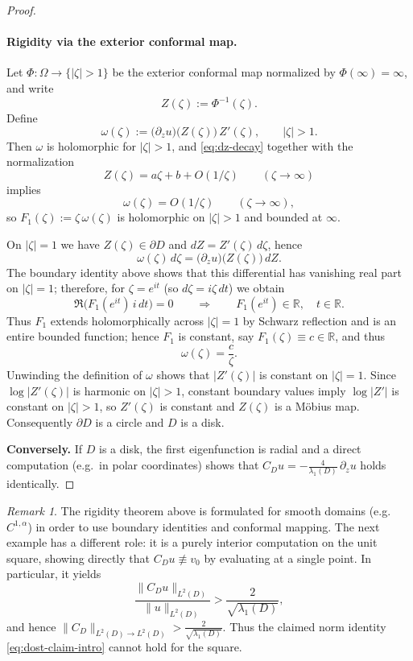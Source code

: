 \documentclass{amsart}
\newcommand{\R}{\mathbb{R}}
\theoremstyle{plain}
\theoremstyle{remark}
\newtheorem{remark}[theorem]{Remark}
\begin{document}
\begin{proof}
\paragraph{Rigidity via the exterior conformal map.}
Let $\Phi:\Omega\to\{|\zeta|>1\}$ be the exterior conformal map normalized by $\Phi(\infty)=\infty$,
and write
\[
Z(\zeta):=\Phi^{-1}(\zeta).
\]
Define
\[
\omega(\zeta):=\bigl(\partial_z u\bigr)\bigl(Z(\zeta)\bigr)\,Z'(\zeta),
\qquad |\zeta|>1.
\]
Then $\omega$ is holomorphic for $|\zeta|>1$, and \eqref{eq:dz-decay} together with the normalization
\[
Z(\zeta)=a\zeta+b+O(1/\zeta)\qquad (\zeta\to\infty)
\]
implies
\[
\omega(\zeta)=O(1/\zeta)\qquad (\zeta\to\infty),
\]
so $F_1(\zeta):=\zeta\,\omega(\zeta)$ is holomorphic on $|\zeta|>1$ and bounded at $\infty$.

On $|\zeta|=1$ we have $Z(\zeta)\in\partial D$ and $dZ=Z'(\zeta)\,d\zeta$, hence
\[
\omega(\zeta)\,d\zeta
=\bigl(\partial_z u\bigr)\bigl(Z(\zeta)\bigr)\,dZ.
\]
The boundary identity above shows that this differential has vanishing real part on $|\zeta|=1$; therefore,
for $\zeta=e^{it}$ (so $d\zeta=i\zeta\,dt$) we obtain
\[
\Re\!\bigl(F_1(e^{it})\,i\,dt\bigr)=0
\qquad\Longrightarrow\qquad
F_1(e^{it})\in\R,\quad t\in\R.
\]
Thus $F_1$ extends holomorphically across $|\zeta|=1$ by Schwarz reflection and is an entire bounded
function; hence $F_1$ is constant, say $F_1(\zeta)\equiv c\in\R$, and thus
\[
\omega(\zeta)=\frac{c}{\zeta}.
\]
Unwinding the definition of $\omega$ shows that $|Z'(\zeta)|$ is constant on $|\zeta|=1$.
Since $\log|Z'(\zeta)|$ is harmonic on $|\zeta|>1$, constant boundary values imply $\log|Z'|$ is constant
on $|\zeta|>1$, so $Z'(\zeta)$ is constant and $Z(\zeta)$ is a M\"obius map. Consequently $\partial D$ is a circle
and $D$ is a disk.


\noindent\textbf{Conversely.}
If $D$ is a disk, the first eigenfunction is radial and a direct computation (e.g.\ in polar coordinates)
shows that $C_D u = -\frac{4}{\lambda_1(D)}\,\partial_z u$ holds identically.
\end{proof}
\begin{remark}
The rigidity theorem above  is formulated for smooth domains (e.g.\ $C^{1,\alpha}$) in order to use
boundary identities and conformal mapping. The next example has a different role: it is a purely
interior computation on the unit square, showing directly that $C_Du\not\equiv v_0$ by evaluating at
a single point. In particular, it yields
\[
\frac{\|C_Du\|_{L^2(D)}}{\|u\|_{L^2(D)}}>\frac{2}{\sqrt{\lambda_1(D)}},
\]
and hence $\|C_D\|_{L^2(D)\to L^2(D)}>\frac{2}{\sqrt{\lambda_1(D)}}$. Thus the claimed norm identity \eqref{eq:dost-claim-intro}
cannot hold for the square.
\end{remark}
\end{document}
